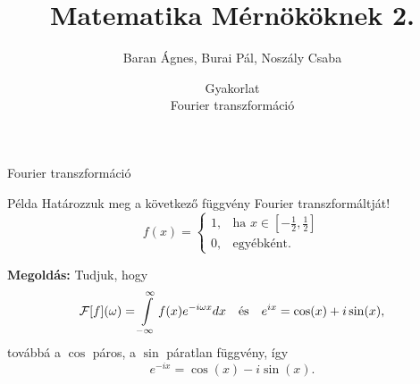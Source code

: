 \documentclass[table]{beamer}
\author[Baran \'Agnes, Burai P\'al, Nosz\'aly Csaba]{Baran \'Agnes, Burai P\'al, Nosz\'aly Csaba}
\title{Matematika M\'ern\"ok\"oknek 2.}
\date[Gyakorlat]{Gyakorlat\\Fourier transzformáció}
\begin{document}
 
\begin{frame}
\maketitle
\end{frame}

\begin{frame}
{Fourier transzformáció}

\begin{exampleblock}{P\'elda}
Határozzuk meg a következő függvény Fourier transzformáltját!
\[
f(x)=\begin{cases}
1,&\mbox{ha }x\in\left[-\frac 12,\frac 12\right]\\
0,&\mbox{egyébként.}
\end{cases}
\]
\end{exampleblock}
{\bf Megold\'as:} Tudjuk, hogy 
\[
{\cal F}[f](\omega) = \int\limits_{-\infty}^{\infty}{f(x)e^{-i\omega x}}{dx}\quad \text{\'es}\quad 
e^{ix}=\cos(x)+i\sin(x), 
\]
tov\'abb\'a a $\cos$ p\'aros, a $\sin$ p\'aratlan f\"uggv\'eny, \'igy 
\[
e^{-ix}=\cos(x)-i\sin(x).
\]

\end{frame}




\end{document}
